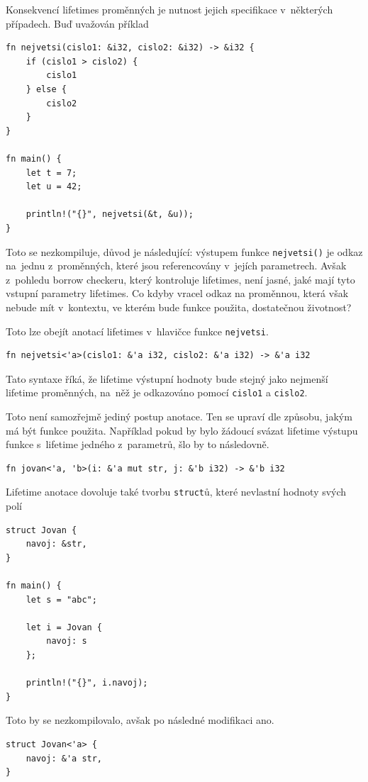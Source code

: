 \documentclass[a4paper, 12pt, twoside]{article} %
\newcommand{\rust}[1]{\texttt{#1}}
\begin{document}
				Konsekvencí lifetimes proměnných je nutnost jejich specifikace v~některých případech. Buď uvažován příklad
				\begin{verbatim}
fn nejvetsi(cislo1: &i32, cislo2: &i32) -> &i32 {
	if (cislo1 > cislo2) {
		cislo1
	} else {
		cislo2
	}
}

fn main() {
	let t = 7;
	let u = 42;
	
	println!("{}", nejvetsi(&t, &u));
}
				\end{verbatim}

				Toto se nezkompiluje, důvod je následující: výstupem funkce \rust{nejvetsi()} je odkaz na~jednu z~proměnných, které jsou referencovány v~jejích parametrech. Avšak z~pohledu borrow checkeru, který kontroluje lifetimes, není jasné, jaké mají tyto vstupní parametry lifetimes. Co kdyby vracel odkaz na proměnnou, která však nebude mít v~kontextu, ve kterém bude funkce použita, dostatečnou životnost? 
				
				Toto lze obejít anotací lifetimes v~hlavičce funkce \rust{nejvetsi}.
				\begin{verbatim}
fn nejvetsi<'a>(cislo1: &'a i32, cislo2: &'a i32) -> &'a i32
				\end{verbatim}
			
				Tato syntaxe říká, že lifetime výstupní hodnoty bude stejný jako nejmenší lifetime proměnných, na~něž je odkazováno pomocí \rust{cislo1} a  \rust{cislo2}.
				
				Toto není samozřejmě jediný postup anotace. Ten se upraví dle způsobu, jakým má být funkce použita. Například pokud by bylo žádoucí svázat lifetime výstupu funkce s~lifetime jedného z~parametrů, šlo by to následovně.
				\begin{verbatim}
fn jovan<'a, 'b>(i: &'a mut str, j: &'b i32) -> &'b i32
				\end{verbatim}
			
				Lifetime anotace dovoluje také tvorbu \texttt{struct}ů, které nevlastní hodnoty svých polí
				\begin{verbatim}
struct Jovan {
	navoj: &str,
}

fn main() {
	let s = "abc";
	
	let i = Jovan {
		navoj: s
	};
	
	println!("{}", i.navoj);
}
				\end{verbatim}
			
				Toto by se nezkompilovalo, avšak po následné modifikaci ano.
				\begin{verbatim}
struct Jovan<'a> {
	navoj: &'a str,
}
				\end{verbatim}
\end{document}
